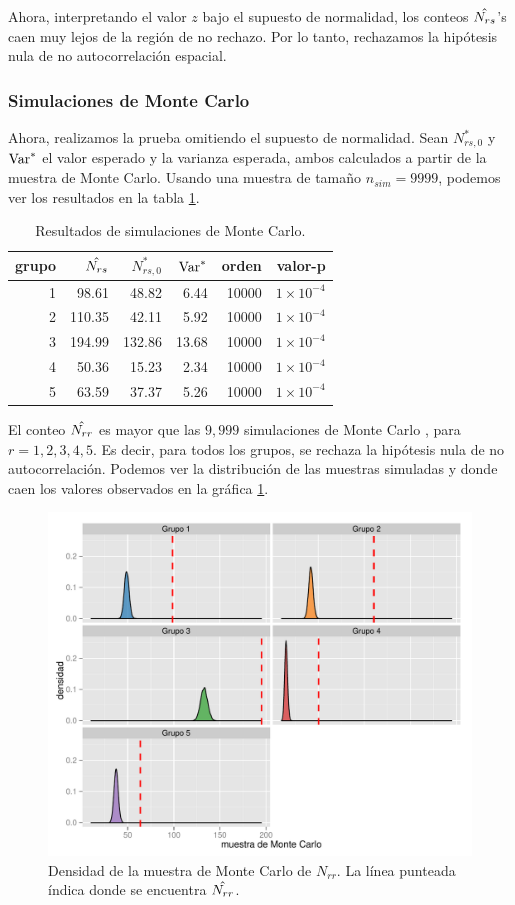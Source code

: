 Ahora, interpretando el valor $z$ bajo el supuesto de normalidad, los conteos $\Hat{N_{rs}}$'s caen muy lejos de la región de no rechazo. Por lo tanto, rechazamos la hipótesis nula de no autocorrelación espacial.


\subsubsection{Simulaciones de Monte Carlo}
Ahora, realizamos la prueba omitiendo el supuesto de normalidad. Sean $N_{rs,0}^*$ y ${\rm{Var}}^*$ el valor esperado y la varianza esperada, ambos calculados a partir de la muestra de Monte Carlo. Usando una muestra de tamaño $n_{sim}=9999$, podemos ver los resultados en la tabla \ref{tab:joincountsmontecarlo}.

\begin{table}[!ht]
\centering
\begin{tabular}{rrrrrr}
  \hline
 grupo & $\Hat{N_{rs}}$  & $N_{rs,0}^*$ & ${\rm{Var}}^*$ & orden & valor-p \\ 
  \hline
  1 & 98.61 & 48.82 & 6.44 & 10000 & $1\times 10^{-4}$ \\ 
  2 & 110.35 & 42.11 & 5.92 & 10000 & $1\times 10^{-4}$ \\ 
  3 & 194.99 & 132.86 & 13.68 & 10000 & $1\times 10^{-4}$ \\ 
  4 & 50.36 & 15.23 & 2.34 & 10000 & $1\times 10^{-4}$ \\ 
  5 & 63.59 & 37.37 & 5.26 & 10000 & $1\times 10^{-4}$ \\ 
   \hline
\end{tabular}
\caption{Resultados de simulaciones de Monte Carlo.}
\label{tab:joincountsmontecarlo}
\end{table}

El conteo $\Hat{N_{rr}}$ es mayor que las $9,999$ simulaciones de Monte Carlo , para $r=1,2,3,4,5$. Es decir, para todos los grupos, se rechaza la hipótesis nula de no autocorrelación. Podemos ver la distribución de las muestras simuladas y donde caen los valores observados en la gráfica \ref{obj:jcdensity}.

\begin{figure}[!ht]
  \centering
  \includegraphics[width=\textwidth]{./plots/jc_density.pdf}
  \caption{Densidad de la muestra de Monte Carlo de $N_{rr}$. La línea punteada índica donde se encuentra $\Hat{N_{rr}}$. \label{obj:jcdensity} }
\end{figure}
